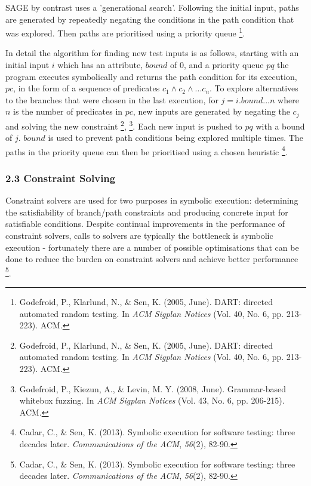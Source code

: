 \documentclass[]{article}
\begin{document}
SAGE by contrast uses a 'generational search'. Following the initial
input, paths are generated by repeatedly negating the conditions in the
path condition that was explored. Then paths are prioritised using a
priority queue \footnote{Godefroid, P., Klarlund, N., \& Sen, K. (2005,
  June). DART: directed automated random testing. In \emph{ACM Sigplan
  Notices} (Vol. 40, No. 6, pp. 213-223). ACM.}.

In detail the algorithm for finding new test inputs is as follows,
starting with an initial input \(i\) which has an attribute, \(bound\)
of 0, and a priority queue \(pq\) the program executes symbolically and
returns the path condition for its execution, \(pc\), in the form of a
sequence of predicates \(c_1 \land c_2 \land ... c_n \). To explore
alternatives to the branches that were chosen in the last execution, for
\(j = i.bound ... n\) where \(n\) is the number of predicates in \(pc\),
new inputs are generated by negating the \(c_j\) and solving the new
constraint \footnote{Godefroid, P., Klarlund, N., \& Sen, K. (2005,
  June). DART: directed automated random testing. In \emph{ACM Sigplan
  Notices} (Vol. 40, No. 6, pp. 213-223). ACM.}, \footnote{Godefroid,
  P., Kiezun, A., \& Levin, M. Y. (2008, June). Grammar-based whitebox
  fuzzing. In \emph{ACM Sigplan Notices} (Vol. 43, No. 6, pp. 206-215).
  ACM.}. Each new input is pushed to \(pq\) with a bound of \(j\).
\(bound\) is used to prevent path conditions being explored multiple
times. The paths in the priority queue can then be prioritised using a
chosen heuristic \footnote{Cadar, C., \& Sen, K. (2013). Symbolic
  execution for software testing: three decades later.
  \emph{Communications of the ACM}, \emph{56}(2), 82-90.}.

\hypertarget{header-n87}{%
\subsubsection{2.3 Constraint Solving}\label{header-n87}}

Constraint solvers are used for two purposes in symbolic execution:
determining the satisfiability of branch/path constraints and producing
concrete input for satisfiable conditions. Despite continual
improvements in the performance of constraint solvers, calls to solvers
are typically the bottleneck is symbolic execution - fortunately there
are a number of possible optimisations that can be done to reduce the
burden on constraint solvers and achieve better performance \footnote{Cadar,
  C., \& Sen, K. (2013). Symbolic execution for software testing: three
  decades later. \emph{Communications of the ACM}, \emph{56}(2), 82-90.}.
\end{document}

